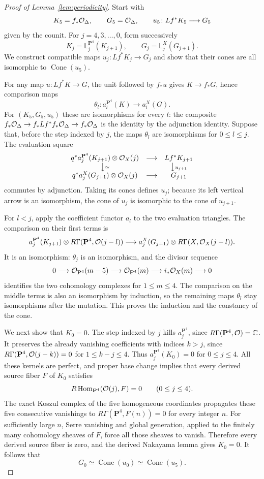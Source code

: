 \begin{proof}[Proof of Lemma~\ref{lem:periodicity}]
Start with
\[
 K_5=f_*\mathcal O_\Delta,\qquad G_5=\mathcal O_\Delta,\qquad
 u_5\colon Lf^*K_5\longrightarrow G_5
\]
given by the counit. For $j=4,3,\ldots,0$, form successively
\[
 K_j=\mathsf L_j^{\mathbf P^4}(K_{j+1}),
 \qquad
 G_j=\mathsf L_j^X(G_{j+1}).
\]
We construct compatible maps $u_j\colon Lf^*K_j\to G_j$ and show
that their cones are all isomorphic to $\operatorname{Cone}(u_5)$.

For any map $u\colon Lf^*K\to G$, the unit followed by $f_*u$ gives
$K\to f_*G$, hence comparison maps
\[
 \theta_l\colon a_l^{\mathbf P^4}(K)\longrightarrow a_l^X(G).
\]
For $(K_5,G_5,u_5)$ these are isomorphisms for every $l$: the composite
$f_*\mathcal O_\Delta\to f_*Lf^*f_*\mathcal O_\Delta\to f_*\mathcal O_\Delta$
is the identity by the adjunction identity. Suppose that, before the
step indexed by $j$, the maps $\theta_l$ are isomorphisms for
$0\le l\le j$. The evaluation square
\[
\begin{array}{ccc}
 q^*a_j^{\mathbf P^4}(K_{j+1})\otimes\mathcal O_X(j)
   &\longrightarrow& Lf^*K_{j+1}\\
 \big\downarrow\scriptstyle{\simeq}&&\big\downarrow\scriptstyle{u_{j+1}}\\
 q^*a_j^X(G_{j+1})\otimes\mathcal O_X(j)
   &\longrightarrow& G_{j+1}
\end{array}
\]
commutes by adjunction. Taking its cones defines $u_j$; because its
left vertical arrow is an isomorphism, the cone of $u_j$ is isomorphic
to the cone of $u_{j+1}$.

For $l<j$, apply the coefficient functor $a_l$ to the two evaluation
triangles. The comparison on their first terms is
\[
 a_j^{\mathbf P^4}(K_{j+1})\otimes R\Gamma(\mathbf P^4,\mathcal O(j-l))
 \longrightarrow
 a_j^X(G_{j+1})\otimes R\Gamma(X,\mathcal O_X(j-l)).
\]
It is an isomorphism: $\theta_j$ is an isomorphism, and the divisor
sequence
\[
 0\longrightarrow\mathcal O_{\mathbf P^4}(m-5)
 \longrightarrow\mathcal O_{\mathbf P^4}(m)
 \longrightarrow i_*\mathcal O_X(m)\longrightarrow0
\]
identifies the two cohomology complexes for $1\le m\le4$.
The comparison on the middle terms is also an isomorphism by induction,
so the remaining maps $\theta_l$ stay isomorphisms after the mutation.
This proves the induction and the constancy of the cone.

We next show that $K_0=0$. The step indexed by $j$ kills
$a_j^{\mathbf P^4}$, since
$R\Gamma(\mathbf P^4,\mathcal O)=\mathbb C$. It preserves the already vanishing
coefficients with indices $k>j$, since
$R\Gamma(\mathbf P^4,\mathcal O(j-k))=0$ for $1\le k-j\le4$.
Thus $a_j^{\mathbf P^4}(K_0)=0$ for $0\le j\le4$.
All these kernels are perfect, and proper base change implies that
every derived source fiber $F$ of $K_0$ satisfies
\[
 R\operatorname{Hom}_{\mathbf P^4}(\mathcal O(j),F)=0
 \qquad(0\le j\le4).
\]
The exact Koszul complex of the five homogeneous coordinates propagates
these five consecutive vanishings to
$R\Gamma(\mathbf P^4,F(n))=0$ for every integer $n$.
For sufficiently large $n$, Serre vanishing and global generation,
applied to the finitely many cohomology sheaves of $F$, force all those
sheaves to vanish. Therefore every derived source fiber is zero, and
the derived Nakayama lemma gives $K_0=0$. It follows that
\[
 G_0\simeq\operatorname{Cone}(u_0)
       \simeq\operatorname{Cone}(u_5).
\]


\end{proof}
